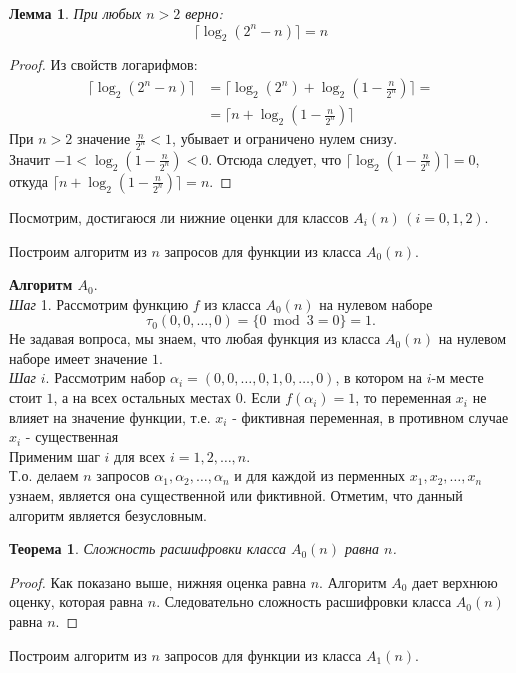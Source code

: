 \documentclass[oneside, final, 14pt]{extreport}
\newtheorem{lem}{Лемма}
\newtheorem{thm}{Теорема}
\begin{document}
	\begin{lem}
		\label{log}
		При любых $n > 2$ верно:
		$$\lceil \log_2(2^n - n) \rceil = n$$
	\end{lem}
	\begin{proof}
		Из свойств логарифмов:
		\begin{displaymath}
		\begin{aligned}
		\lceil \log_2(2^n - n) \rceil & = \lceil \log_2(2^n) + \log_2(1 - \frac{n}{2^n}) \rceil =\\
												&= \lceil n + \log_2(1 - \frac{n}{2^n}) \rceil	
	    \end{aligned}
		\end{displaymath}
		При $n > 2$ значение  $\frac{n}{2^n} < 1$, убывает и ограничено нулем снизу. \\
		Значит  $ -1 < \log_2(1 - \frac{n}{2^n}) < 0$.
		Отсюда следует, что $\lceil \log_2(1 - \frac{n}{2^n})\rceil = 0 $, откуда $\lceil n + \log_2(1 - \frac{n}{2^n}) \rceil = n$.
	\end{proof} \par
	\bigskip
	\noindent Посмотрим, достигаюся ли нижние оценки для классов $A_i(n) \, (i= 0,1,2)$. \par
	\bigskip
	\noindent Построим алгоритм из $n$ запросов  для функции из класса  $A_0(n)$.
	
	\noindent\textbf{Алгоритм $A_0$}. \\
	\emph{Шаг} 1. Рассмотрим функцию $f$  из класса $A_0(n)$ на нулевом наборе
	 \[
	 	\tau_0(0, 0, \ldots, 0) =  \{0  \bmod 3 = 0\} = 1.
	 \]
	 Не задавая вопроса, мы знаем, что любая функция из класса $A_0(n)$ на нулевом наборе имеет значение $1$.\\
	 \emph{Шаг} $i$. Рассмотрим набор $\alpha_i = (0, 0,  \ldots, 0, 1, 0, \ldots, 0)$, в котором на $i$-м месте стоит $1$, а на всех остальных местах $0$.
	 Если $f(\alpha_i) = 1$, то переменная $x_i$ не влияет на значение функции, т.е. $x_i$ - 
	 фиктивная переменная, в противном случае $x_i$ - существенная \\
	 Применим шаг $i$ для всех $i = 1, 2, \ldots, n$. \\ 
	 \noindent Т.о. делаем $n$  запросов $\alpha_1, \alpha_2, \ldots, \alpha_n$ и для каждой из перменных $x_1, x_2, \ldots, x_n$ узнаем, является она существенной 
	 или фиктивной. Отметим, что данный алгоритм является безусловным. \par
	\begin{thm} 
		Сложность расшифровки класса $A_0(n)$ равна $n$. 
	\end{thm}
	\begin{proof}
		Как показано выше, нижняя оценка равна $n$. Алгоритм $A_0$ дает верхнюю оценку, которая равна $n$. Следовательно сложность расшифровки класса
		$A_0(n)$ равна $n$.
	\end{proof} \par
	\noindent Построим алгоритм из $n$ запросов  для функции из класса  $A_1(n)$.
	
\end{document}
